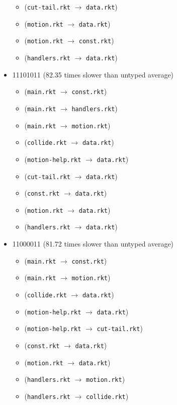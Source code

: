 \documentclass{article}
\newcommand{\mono}[1]{\texttt{#1}}
\begin{document}
\begin{itemize}
\begin{itemize}
  \item (\mono{cut-tail.rkt} $\rightarrow$ \mono{data.rkt})
  \item (\mono{motion.rkt} $\rightarrow$ \mono{data.rkt})
  \item (\mono{motion.rkt} $\rightarrow$ \mono{const.rkt})
  \item (\mono{handlers.rkt} $\rightarrow$ \mono{data.rkt})
  \end{itemize}
\item 11101011 (82.35 times slower than untyped average)
  \begin{itemize}
  \item (\mono{main.rkt} $\rightarrow$ \mono{const.rkt})
  \item (\mono{main.rkt} $\rightarrow$ \mono{handlers.rkt})
  \item (\mono{main.rkt} $\rightarrow$ \mono{motion.rkt})
  \item (\mono{collide.rkt} $\rightarrow$ \mono{data.rkt})
  \item (\mono{motion-help.rkt} $\rightarrow$ \mono{data.rkt})
  \item (\mono{cut-tail.rkt} $\rightarrow$ \mono{data.rkt})
  \item (\mono{const.rkt} $\rightarrow$ \mono{data.rkt})
  \item (\mono{motion.rkt} $\rightarrow$ \mono{data.rkt})
  \item (\mono{handlers.rkt} $\rightarrow$ \mono{data.rkt})
  \end{itemize}
\item 11000011 (81.72 times slower than untyped average)
  \begin{itemize}
  \item (\mono{main.rkt} $\rightarrow$ \mono{const.rkt})
  \item (\mono{main.rkt} $\rightarrow$ \mono{motion.rkt})
  \item (\mono{collide.rkt} $\rightarrow$ \mono{data.rkt})
  \item (\mono{motion-help.rkt} $\rightarrow$ \mono{data.rkt})
  \item (\mono{motion-help.rkt} $\rightarrow$ \mono{cut-tail.rkt})
  \item (\mono{const.rkt} $\rightarrow$ \mono{data.rkt})
  \item (\mono{motion.rkt} $\rightarrow$ \mono{data.rkt})
  \item (\mono{handlers.rkt} $\rightarrow$ \mono{motion.rkt})
  \item (\mono{handlers.rkt} $\rightarrow$ \mono{collide.rkt})

\end{itemize}
\end{itemize}
\end{document}
